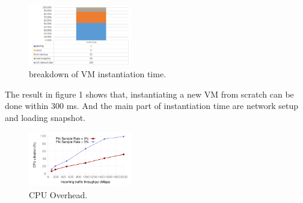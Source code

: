 \begin{figure}[H]
\includegraphics[width=0.4\textwidth]{figs/instantiation.png}
\caption{breakdown of VM instantiation time.}
\end{figure}

The result in figure 1 shows that, instantiating a new VM from scratch can be done within 300 ms. And the main part of instantiation time are network setup and loading snapshot.



\begin{figure}[H]
\includegraphics[width=0.4\textwidth]{figs/CPU.png}
\caption{CPU Overhead.}
\end{figure}
